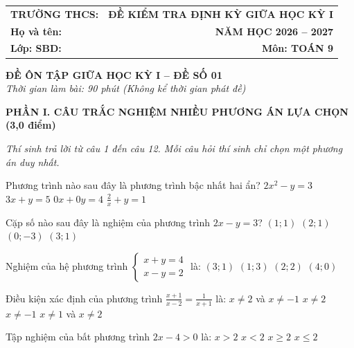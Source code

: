 \documentclass[12pt,a4paper]{article}
\begin{document}
\noindent
\begin{tabularx}{\linewidth}{X r}
\textbf{TRƯỜNG THCS: \dotfill} & \textbf{ĐỀ KIỂM TRA ĐỊNH KỲ GIỮA HỌC KỲ I} \\
\textbf{Họ và tên: \dotfill} & \textbf{NĂM HỌC 2026 -- 2027} \\
\textbf{Lớp: \dotfill \quad SBD: \dotfill} & \textbf{Môn: TOÁN 9} \\
\hline
\end{tabularx}
\vspace{2mm}

\begin{center}
  \textbf{\large ĐỀ ÔN TẬP GIỮA HỌC KỲ I -- ĐỀ SỐ 01}\\
  \textit{Thời gian làm bài: 90 phút (Không kể thời gian phát đề)}
\end{center}
\vspace{1mm}

\noindent\textbf{\large PHẦN I. CÂU TRẮC NGHIỆM NHIỀU PHƯƠNG ÁN LỰA CHỌN (3,0 điểm)}

\textit{Thí sinh trả lời từ câu 1 đến câu 12. Mỗi câu hỏi thí sinh chỉ chọn một phương án duy nhất.}

\vspace{1mm}
\begin{ex}
Phương trình nào sau đây là phương trình bậc nhất hai ẩn?
\choice
{$2x^2 - y = 3$}
{\True $3x + y = 5$}
{$0x + 0y = 4$}
{$\frac{2}{x} + y = 1$}
\end{ex}

\begin{ex}
Cặp số nào sau đây là nghiệm của phương trình $2x - y = 3$?
\choice
{$(1; 1)$}
{\True $(2; 1)$}
{$(0; -3)$}
{$(3; 1)$}
\end{ex}

\begin{ex}
Nghiệm của hệ phương trình $\begin{cases} x + y = 4 \\ x - y = 2 \end{cases}$ là:
\choice
{\True $(3; 1)$}
{$(1; 3)$}
{$(2; 2)$}
{$(4; 0)$}
\end{ex}

\begin{ex}
Điều kiện xác định của phương trình $\frac{x+1}{x-2} = \frac{1}{x+1}$ là:
\choice
{\True $x \neq 2$ và $x \neq -1$}
{$x \neq 2$}
{$x \neq -1$}
{$x \neq 1$ và $x \neq 2$}
\end{ex}

\begin{ex}
Tập nghiệm của bất phương trình $2x - 4 > 0$ là:
\choice
{\True $x > 2$}
{$x < 2$}
{$x \ge 2$}
{$x \le 2$}
\end{ex}
\end{document}
